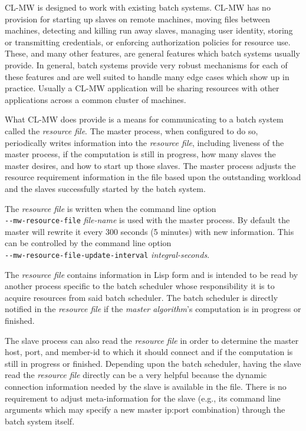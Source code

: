 \documentclass[titlepage,12pt]{book}
\newcommand{\xsmall}{\latexhtml{\small}{}}
\newcommand{\xnormalsize}{\latexhtml{\normalsize}{}}
\newcommand{\clmw}{\xsmall\textsc{CL-MW}\xnormalsize\xspace}
\newcommand{\ma}{\textit{master algorithm}\xspace}
\newcommand{\rfile}{\textit{resource file}\xspace}
\newcommand{\dash}{\texttt{-}}
\newcommand{\OptionV}[2]{\dash\dash\texttt{#1} \textit{#2}}
\begin{document}
\clmw is designed to work with existing batch systems.  \clmw has no
provision for starting up slaves on remote machines, moving files
between machines, detecting and killing run away slaves, managing
user identity, storing or transmitting credentials, or enforcing
authorization policies for resource use.  These, and many other
features, are general features which batch systems usually provide.
In general, batch systems provide very robust mechanisms for each of
these features and are well suited to handle many edge cases which
show up in practice. Usually a \clmw application will be sharing
resources with other applications across a common cluster of machines.

What \clmw does provide is a means for communicating to a batch system
called the \rfile.  The master process, when configured to do so,
periodically writes information into the \rfile, including liveness
of the master process, if the computation is still in progress, how
many slaves the master desires, and how to start up those slaves.
The master process adjusts the resource requirement information in the
file based upon the outstanding workload and the slaves successfully
started by the batch system.

The \rfile is written when the command line option\\
\OptionV{mw-resource-file}{file-name} is used with the
master process. By default the master will rewrite it
every 300 seconds (5 minutes) with new information. This
can be controlled by the command line option\\
\OptionV{mw-resource-file-update-interval}{integral-seconds}.

The \rfile contains information in Lisp form and is intended to be read by
another process specific to the batch scheduler whose responsibility it
is to acquire resources from said batch scheduler. The batch scheduler
is directly notified in the \rfile if the {\ma}'s computation is in
progress or finished.

The slave process can also read the \rfile in order to determine the
master host, port, and member-id to which it should connect and if
the computation is still in progress or finished.  Depending upon the
batch scheduler, having the slave read the \rfile directly can be a
very helpful because the dynamic connection information needed by the
slave is available in the file. There is no requirement to adjust
meta-information for the slave (e.g., its command line arguments
which may specify a new master ip:port combination) through the batch
system itself.
\end{document}
